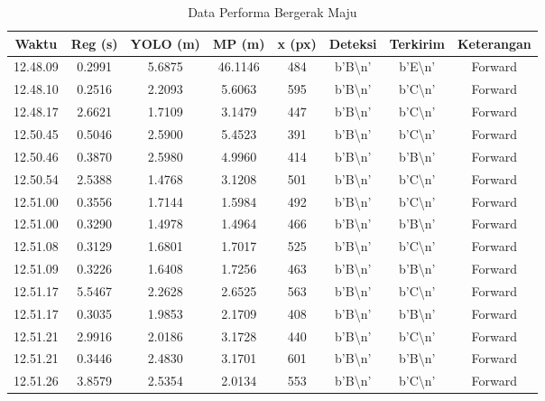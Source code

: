 \begin{table}[H]
    \centering
    \caption{Data Performa Bergerak Maju}
    \label{tab:performa_bergerak_maju}
    \begin{tabular}{|c|c|c|c|c|c|c|c|}
    \hline
    Waktu & Reg (s) & YOLO (m) & MP (m) & x (px) & Deteksi & Terkirim & Keterangan \\ \hline
    12.48.09 & 0.2991 & 5.6875 & 46.1146 & 484 & b'B\textbackslash n' & b'E\textbackslash n' & Forward \\ \hline
    12.48.10 & 0.2516 & 2.2093 & 5.6063 & 595 & b'B\textbackslash n' & b'C\textbackslash n' & Forward \\ \hline
    12.48.17 & 2.6621 & 1.7109 & 3.1479 & 447 & b'B\textbackslash n' & b'C\textbackslash n' & Forward \\ \hline
    12.50.45 & 0.5046 & 2.5900 & 5.4523 & 391 & b'B\textbackslash n' & b'C\textbackslash n' & Forward \\ \hline
    12.50.46 & 0.3870 & 2.5980 & 4.9960 & 414 & b'B\textbackslash n' & b'B\textbackslash n' & Forward \\ \hline
    12.50.54 & 2.5388 & 1.4768 & 3.1208 & 501 & b'B\textbackslash n' & b'C\textbackslash n' & Forward \\ \hline
    12.51.00 & 0.3556 & 1.7144 & 1.5984 & 492 & b'B\textbackslash n' & b'C\textbackslash n' & Forward \\ \hline
    12.51.00 & 0.3290 & 1.4978 & 1.4964 & 466 & b'B\textbackslash n' & b'B\textbackslash n' & Forward \\ \hline
    12.51.08 & 0.3129 & 1.6801 & 1.7017 & 525 & b'B\textbackslash n' & b'C\textbackslash n' & Forward \\ \hline
    12.51.09 & 0.3226 & 1.6408 & 1.7256 & 463 & b'B\textbackslash n' & b'B\textbackslash n' & Forward \\ \hline
    12.51.17 & 5.5467 & 2.2628 & 2.6525 & 563 & b'B\textbackslash n' & b'C\textbackslash n' & Forward \\ \hline
    12.51.17 & 0.3035 & 1.9853 & 2.1709 & 408 & b'B\textbackslash n' & b'B\textbackslash n' & Forward \\ \hline
    12.51.21 & 2.9916 & 2.0186 & 3.1728 & 440 & b'B\textbackslash n' & b'C\textbackslash n' & Forward \\ \hline
    12.51.21 & 0.3446 & 2.4830 & 3.1701 & 601 & b'B\textbackslash n' & b'B\textbackslash n' & Forward \\ \hline
    12.51.26 & 3.8579 & 2.5354 & 2.0134 & 553 & b'B\textbackslash n' & b'C\textbackslash n' & Forward \\ \hline

\end{tabular}
\end{table}
